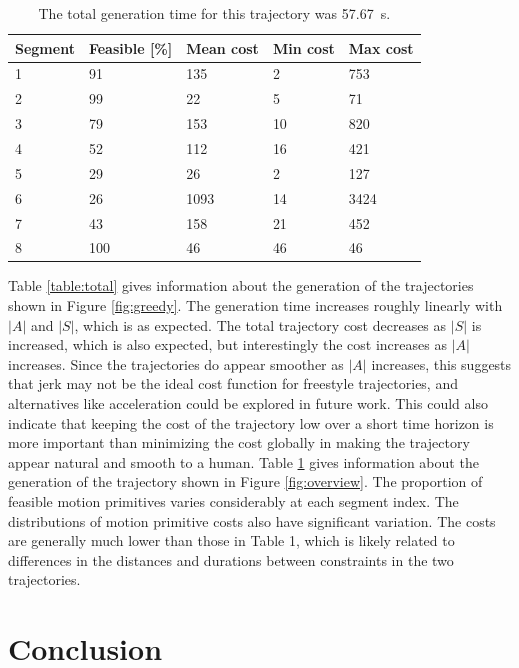 \documentclass[pageno]{jpaper}
\begin{document}
\begin{table}[hbt]
  \centering
  \begin{tabular}{|l|l|l|l|l|} \hline
    \textbf{Segment} & \textbf{Feasible [\%]} & \textbf{Mean cost} & \textbf{Min cost} & \textbf{Max cost} \\ \hline
    1 & 91 & 135 & 2 & 753 \\ \hline
    2 & 99 & 22 & 5 & 71 \\ \hline
    3 & 79 & 153 & 10 & 820 \\ \hline
    4 & 52 & 112 & 16 & 421 \\ \hline
    5 & 29 & 26 & 2 & 127 \\ \hline
    6 & 26 & 1093 & 14 & 3424 \\ \hline
    7 & 43 & 158 & 21 & 452 \\ \hline
    8 & 100 & 46 & 46 & 46 \\ \hline
  \end{tabular}
  \caption{The total generation time for this trajectory was \qty{57.67}{s}.}
  \label{table:segments}
\end{table}

Table \ref{table:total} gives information about the generation of the trajectories shown in Figure \ref{fig:greedy}. The generation time increases roughly linearly with $|A|$ and $|S|$, which is as expected. The total trajectory cost decreases as $|S|$ is increased, which is also expected, but interestingly the cost increases as $|A|$ increases. Since the trajectories do appear smoother as $|A|$ increases, this suggests that jerk may not be the ideal cost function for freestyle trajectories, and alternatives like acceleration could be explored in future work. This could also indicate that keeping the cost of the trajectory low over a short time horizon is more important than minimizing the cost globally in making the trajectory appear natural and smooth to a human. Table \ref{table:segments} gives information about the generation of the trajectory shown in Figure \ref{fig:overview}. The proportion of feasible motion primitives varies considerably at each segment index. The distributions of motion primitive costs also have significant variation. The costs are generally much lower than those in Table 1, which is likely related to differences in the distances and durations between constraints in the two trajectories.

\section{Conclusion}
\end{document}
